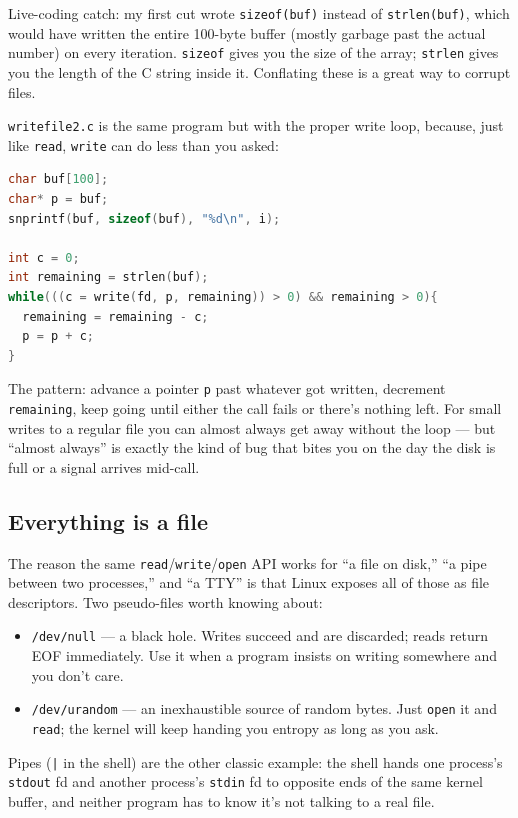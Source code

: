 \documentclass[11pt]{article}
\begin{document}
Live-coding catch: my first cut wrote \texttt{sizeof(buf)} instead of
\texttt{strlen(buf)}, which would have written the entire 100-byte
buffer (mostly garbage past the actual number) on every iteration.
\texttt{sizeof} gives you the size of the array; \texttt{strlen} gives
you the length of the C string inside it. Conflating these is a great
way to corrupt files.

\texttt{writefile2.c} is the same program but with the proper write
loop, because, just like \texttt{read}, \texttt{write} can do less
than you asked:

\begin{lstlisting}[language=C]
char buf[100];
char* p = buf;
snprintf(buf, sizeof(buf), "%d\n", i);

int c = 0;
int remaining = strlen(buf);
while(((c = write(fd, p, remaining)) > 0) && remaining > 0){
  remaining = remaining - c;
  p = p + c;
}
\end{lstlisting}

The pattern: advance a pointer \texttt{p} past whatever got written,
decrement \texttt{remaining}, keep going until either the call fails
or there's nothing left. For small writes to a regular file you can
almost always get away without the loop --- but ``almost always'' is
exactly the kind of bug that bites you on the day the disk is full or
a signal arrives mid-call.

\subsection*{Everything is a file}

The reason the same \texttt{read}/\texttt{write}/\texttt{open} API
works for ``a file on disk,'' ``a pipe between two processes,'' and
``a TTY'' is that Linux exposes all of those as file descriptors.
Two pseudo-files worth knowing about:
\begin{itemize}
  \item \texttt{/dev/null} --- a black hole. Writes succeed and are
    discarded; reads return EOF immediately. Use it when a program
    insists on writing somewhere and you don't care.
  \item \texttt{/dev/urandom} --- an inexhaustible source of random
    bytes. Just \texttt{open} it and \texttt{read}; the kernel will
    keep handing you entropy as long as you ask.
\end{itemize}
Pipes (\texttt{|} in the shell) are the other classic example: the
shell hands one process's \texttt{stdout} fd and another process's
\texttt{stdin} fd to opposite ends of the same kernel buffer, and
neither program has to know it's not talking to a real file.
\end{document}
